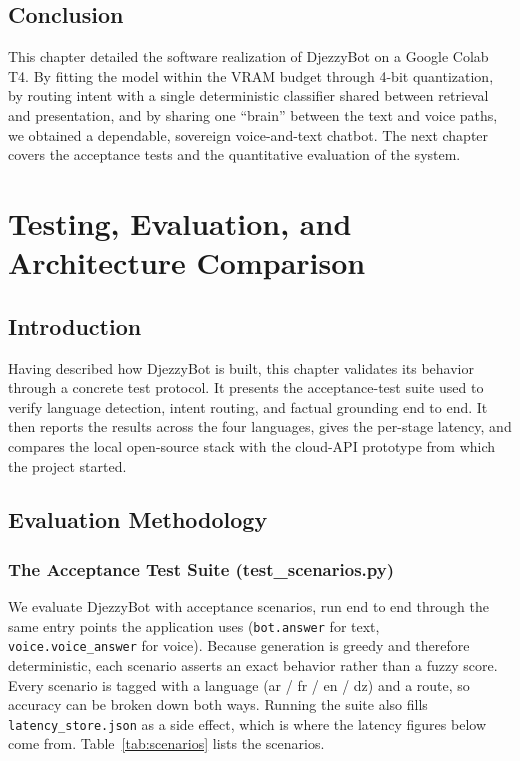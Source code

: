 \documentclass[12pt, a4paper]{report}
\newcommand{\humantext}[1]{#1}      %
\begin{document}
\section{Conclusion}
\humantext{This chapter detailed the software realization of DjezzyBot on a Google Colab T4. By fitting the model within the VRAM budget through 4-bit quantization, by routing intent with a single deterministic classifier shared between retrieval and presentation, and by sharing one ``brain'' between the text and voice paths, we obtained a dependable, sovereign voice-and-text chatbot. The next chapter covers the acceptance tests and the quantitative evaluation of the system.}


\chapter{Testing, Evaluation, and Architecture Comparison}

\section{Introduction}
\humantext{Having described how DjezzyBot is built, this chapter validates its behavior through a concrete test protocol.} \humantext{It presents the acceptance-test suite used to verify language detection, intent routing, and factual grounding end to end. It then reports the results across the four languages, gives the per-stage latency, and compares the local open-source stack with the cloud-API prototype from which the project started.}

\section{Evaluation Methodology}

\subsection{The Acceptance Test Suite (test\_scenarios.py)}
\humantext{We evaluate DjezzyBot with \numTestsTotal{} acceptance scenarios, run end to end through the same entry points the application uses (\texttt{bot.answer} for text, \texttt{voice.voice\_answer} for voice). Because generation is greedy and therefore deterministic, each scenario asserts an exact behavior rather than a fuzzy score. Every scenario is tagged with a language (ar / fr / en / dz) and a route, so accuracy can be broken down both ways. Running the suite also fills \texttt{latency\_store.json} as a side effect, which is where the latency figures below come from. Table~\ref{tab:scenarios} lists the scenarios.}
\end{document}
